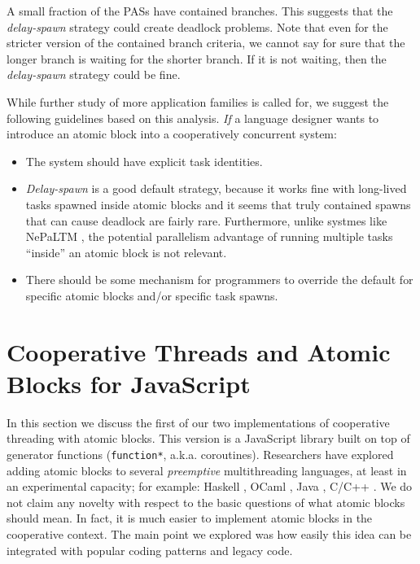 \documentclass[acmsmall,anonymous,review]{acmart}\settopmatter{printfolios=true,printccs=false,printacmref=false}
\begin{document}
A small fraction of the PASs have contained branches.
This suggests that the \emph{delay-spawn} strategy could create deadlock problems.
Note that even for the stricter version of the contained branch criteria, we cannot say for sure that the longer branch is waiting for the shorter branch.
If it is not waiting, then the \emph{delay-spawn} strategy could be fine.


While further study of more application families is called for, we suggest the following guidelines based on this analysis.
\emph{If} a language designer wants to introduce an atomic block into a cooperatively concurrent system:
\begin{itemize}
\item The system should have explicit task identities.
\item \emph{Delay-spawn} is a good default strategy, because it works fine with long-lived tasks spawned inside atomic blocks and it seems that truly contained spawns that can cause deadlock are fairly rare.
  Furthermore, unlike systmes like NePaLTM \cite{Volos2009}, the potential parallelism advantage of running multiple tasks ``inside'' an atomic block is not relevant.
\item There should be some mechanism for programmers to override the default for specific atomic blocks and/or specific task spawns.
\end{itemize}

\section{Cooperative Threads and Atomic Blocks for JavaScript}

In this section we discuss the first of our two implementations of cooperative threading with atomic blocks.
This version is a JavaScript library built on top of generator functions (\texttt{function*}, a.k.a. coroutines).
Researchers have explored adding atomic blocks to several \emph{preemptive} multithreading languages, at least in an experimental capacity; for example: Haskell \cite{Harris2005}, OCaml \cite{Ringenburg2005}, Java \cite{Herlihy2006}, C/C++ \cite{Ni2008}.
We do not claim any novelty with respect to the basic questions of what atomic blocks should mean.
In fact, it is much easier to implement atomic blocks in the cooperative context.
The main point we explored was how easily this idea can be integrated with popular coding patterns and legacy code.
\end{document}
